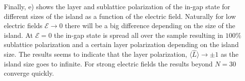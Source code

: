 Finally, e) shows the layer and sublattice polarization of the in-gap state for different sizes of the island as a function of the electric field. Naturally for low electric fields $\mathcal{E}\to0$ there will be a big difference depending on the size of the island. At $\mathcal{E}=0$ the in-gap state is spread all over the sample resulting in $100\%$ sublattice polarization and a certain layer polarization depending on the island size. The results seems to indicate that the layer polarization, $\langle\hat{L}\rangle\to\pm1$ as the island size goes to infinite. For strong electric fields the results beyond $N=30$ converge quickly.




%   
%   
%   
